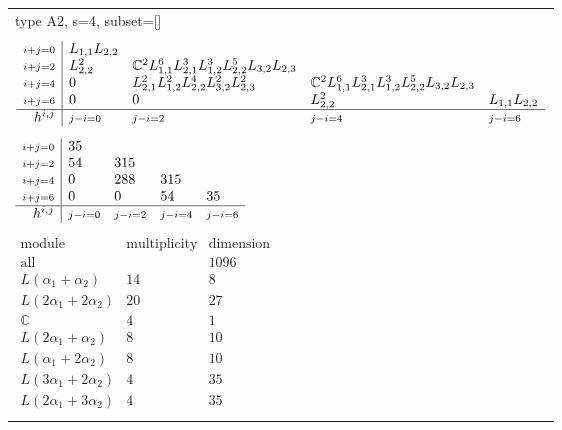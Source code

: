 \documentclass[crop,border=2mm]{standalone}
\begin{document}
\begin{tabular}{l}
{\huge type A2, s=4, subset=[]}\\ \\


$\displaystyle
\begin{array}{r|l l l l}
	{\scriptstyle i+j=0}&L_{1,1}L_{2,2}&&&\\
	{\scriptstyle i+j=2}&L_{2,2}^{2}&\mathbb{C}^{2}L_{1,1}^{6}L_{2,1}^{3}L_{1,2}^{3}L_{2,2}^{5}L_{3,2}L_{2,3}&&\\
	{\scriptstyle i+j=4}&0&L_{2,1}^{2}L_{1,2}^{2}L_{2,2}^{4}L_{3,2}^{2}L_{2,3}^{2}&\mathbb{C}^{2}L_{1,1}^{6}L_{2,1}^{3}L_{1,2}^{3}L_{2,2}^{5}L_{3,2}L_{2,3}&\\
	{\scriptstyle i+j=6}&0&0&L_{2,2}^{2}&L_{1,1}L_{2,2}\\
	\hline h^{i,j}&{\scriptstyle j-i=0}&{\scriptstyle j-i=2}&{\scriptstyle j-i=4}&{\scriptstyle j-i=6}
\end{array}
$ \\ \\


$\displaystyle
\begin{array}{r|l l l l}
	{\scriptstyle i+j=0}&35&&&\\
	{\scriptstyle i+j=2}&54&315&&\\
	{\scriptstyle i+j=4}&0&288&315&\\
	{\scriptstyle i+j=6}&0&0&54&35\\
	\hline h^{i,j}&{\scriptstyle j-i=0}&{\scriptstyle j-i=2}&{\scriptstyle j-i=4}&{\scriptstyle j-i=6}
\end{array}
$ \\ \\


$\displaystyle
\begin{array}{rll}
	\text{module}&\text{multiplicity}&\text{dimension} \\ \hline \text{all}&&1096 \\
	L\left(\alpha_{1}+\alpha_{2}\right)&14&8\\
	L\left( 2\alpha_{1}+ 2\alpha_{2}\right)&20&27\\
	\mathbb{C}&4&1\\
	L\left( 2\alpha_{1}+\alpha_{2}\right)&8&10\\
	L\left(\alpha_{1}+ 2\alpha_{2}\right)&8&10\\
	L\left( 3\alpha_{1}+ 2\alpha_{2}\right)&4&35\\
	L\left( 2\alpha_{1}+ 3\alpha_{2}\right)&4&35
\end{array}
$ \\ \\

\end{tabular}
\end{document}
